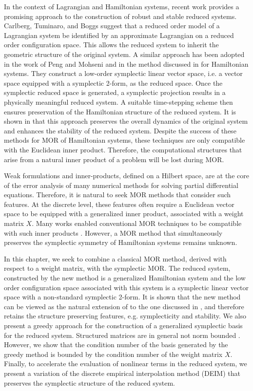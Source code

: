 In the context of Lagrangian and Hamiltonian systems, recent work provides a promising approach to the construction of robust and stable reduced systems. Carlberg, Tuminaro, and Boggs \cite{doi:10.1137/140959602} suggest that a reduced order model of a Lagrangian system be identified by an approximate Lagrangian on a reduced order configuration space. This allows the reduced system to inherit the geometric structure of the original system. A similar approach has been adopted in the work of Peng and Mohseni \cite{doi:10.1137/140978922} and in the method discussed in  for Hamiltonian systems. They construct a low-order symplectic linear vector space, i.e. a vector space equipped with a symplectic 2-form, as the reduced space. Once the symplectic reduced space is generated, a symplectic projection results in a physically meaningful reduced system. A suitable time-stepping scheme then ensures preservation of the Hamiltonian structure of the reduced system. It is shown in \cite{doi:10.1137/17M1111991,doi:10.1137/140978922} that this approach preserves the overall dynamics of the original system and enhances the stability of the reduced system. Despite the success of these methods for MOR of Hamiltonian systems, these techniques are only compatible with the Euclidean inner product. Therefore, the computational structures that arise from a natural inner product of a problem will be lost during MOR.

Weak formulations and inner-products, defined on a Hilbert space, are at the core of the error analysis of many numerical methods for solving partial differential equations. Therefore, it is natural to seek MOR methods that consider such features. At the discrete level, these features often require a Euclidean vector space to be equipped with a generalized inner product, associated with a weight matrix $X$. Many works enabled conventional MOR techniques to be compatible with such inner products \cite{sen2006natural}. However, a MOR method that simultaneously preserves the symplectic symmetry of Hamiltonian systems remains unknown. 

In this chapter, we seek to combine a classical MOR method, derived with respect to a weight matrix, with the symplectic MOR. The reduced system, constructed by the new method is a generalized Hamiltonian system and the low order configuration space associated with this system is a symplectic linear vector space with a non-standard symplectic 2-form. It is shown that the new method can be viewed as the natural extension of to the one discussed in , and therefore retains the structure preserving features, e.g. symplecticity and stability. We also present a greedy approach for the construction of a generalized symplectic basis for the reduced system. Structured matrices are in general not norm bounded \cite{doi:10.1137/050628519}. However, we show that the condition number of the basis generated by the greedy method is bounded by the condition number of the weight matrix $X$. Finally, to accelerate the evaluation of nonlinear terms in the reduced system, we present a variation of the discrete empirical interpolation method (DEIM) that preserves the symplectic structure of the reduced system.

